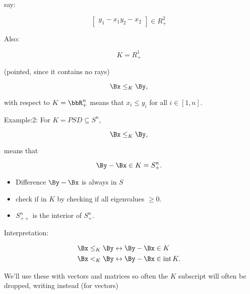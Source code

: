 say:

\begin{dmath}\label{eqn:convexOptimizationLecture4:520}
\begin{bmatrix}
y_1 - x_1
y_2 - x_2
\end{bmatrix}
\in R^2_{+}
\end{dmath}

Also:

\begin{dmath}\label{eqn:convexOptimizationLecture4:540}
K = R^1_{+}
\end{dmath}

(pointed, since it contains no rays)

\begin{equation}\label{eqn:convexOptimizationLecture4:560}
\Bx \le_K \By ,
\end{equation}

with respect to \( K = \bbR^n_{+} \) means that \( x_i \le y_i \) for all \( i \in [1,n]\).

Example:2: For \( K = PSD \subseteq S^n \),

\begin{equation}\label{eqn:convexOptimizationLecture4:580}
\Bx \le_K \By ,
\end{equation}

means that

\begin{equation}\label{eqn:convexOptimizationLecture4:600}
\By - \Bx \in K = S^n_{+}.
\end{equation}

\begin{itemize}
\item Difference \( \By - \Bx \) is always in \( S \)
\item check if in \( K \) by checking if all eigenvalues \( \ge 0 \).
\item \( S^n_{++} \) is the interior of \( S^n_{+} \).
\end{itemize}

Interpretation:

\begin{equation}\label{eqn:convexOptimizationLecture4:620}
\begin{aligned}
\Bx \le_K \By &\leftrightarrow \By - \Bx \in K \\
\Bx <_K \By   &\leftrightarrow \By - \Bx \in \interior K.
\end{aligned}
\end{equation}

We'll use these with vectors and matrices so often the \( K \) subscript will often be dropped, writing instead (for vectors)

